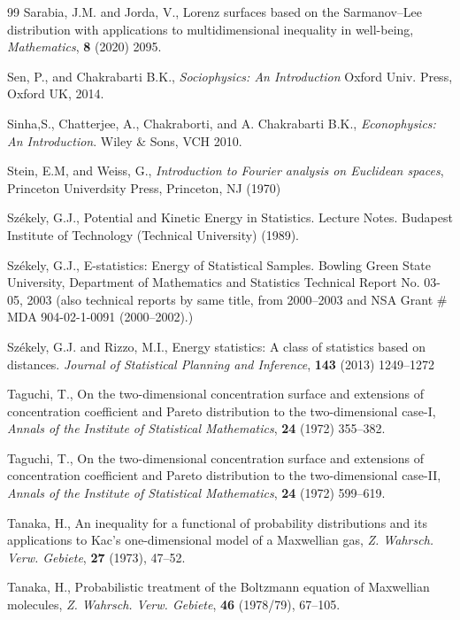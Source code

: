 \documentclass{article}
\begin{document}
\begin{thebibliography}{99}
Sarabia, J.M. and Jorda, V.,  Lorenz surfaces based on the Sarmanov–Lee distribution with applications to multidimensional inequality in well-being, \textit{Mathematics}, \textbf{8}  (2020) 2095.

Sen, P., and Chakrabarti B.K.,
\emph{Sociophysics: An Introduction} Oxford Univ. Press, Oxford UK, 2014.



Sinha,S., Chatterjee, A., Chakraborti, and A. Chakrabarti B.K.,
\emph{Econophysics: An Introduction}. \newblock Wiley \& Sons, VCH 2010.

Stein, E.M, and Weiss, G., \emph{Introduction to Fourier analysis on Euclidean spaces}, Princeton Univerdsity Press, Princeton, NJ (1970)

Sz\'ekely, G.J.,  Potential and Kinetic Energy in Statistics. Lecture Notes. Budapest Institute of Technology (Technical University) (1989).

Sz\'ekely, G.J.,  E-statistics: Energy of Statistical Samples. Bowling Green State University, Department of Mathematics and Statistics Technical Report No. 03-05, 2003 (also technical reports by same title, from 2000–2003 and NSA Grant \# MDA 904-02-1-0091 (2000–2002).)

Sz\'ekely, G.J. and Rizzo, M.I.,
Energy statistics: A class of statistics based on distances. \emph{Journal of Statistical  Planning and Inference}, \textbf{143} (2013) 1249--1272

Taguchi, T.,  On the two-dimensional concentration surface and extensions of concentration coefficient and Pareto distribution to the two-dimensional case-I, \textit{Annals of the Institute of Statistical Mathematics}, \textbf{24} (1972) 355--382.

Taguchi, T.,  On the two-dimensional concentration surface and extensions of concentration coefficient and Pareto distribution to the two-dimensional case-II, \textit{Annals of the Institute of Statistical Mathematics}, \textbf{24}  (1972) 599--619.

Tanaka, H., An inequality for a functional of probability distributions and its applications to Kac’s one-dimensional model of a Maxwellian gas, \emph{Z. Wahrsch. Verw. Gebiete}, \textbf{27} (1973), 47--52.

Tanaka, H.,  Probabilistic treatment of the Boltzmann equation of Maxwellian molecules, \emph{Z. Wahrsch. Verw. Gebiete}, \textbf{46} (1978/79), 67--105.


\end{thebibliography}
\end{document}
